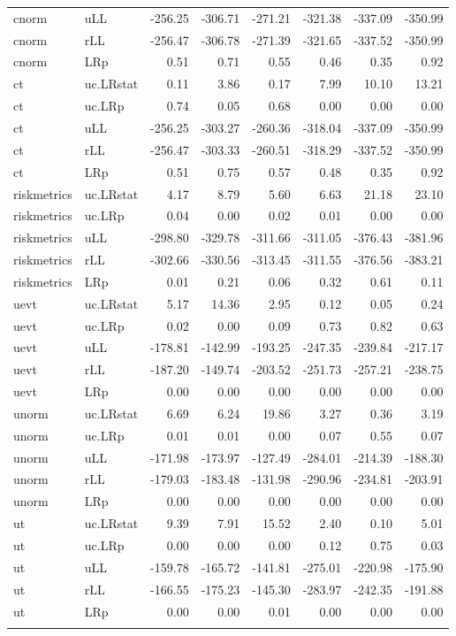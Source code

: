 \begin{longtable}{llrrrrrr}
  cnorm & uLL & -256.25 & -306.71 & -271.21 & -321.38 & -337.09 & -350.99 \\ 
  cnorm & rLL & -256.47 & -306.78 & -271.39 & -321.65 & -337.52 & -350.99 \\ 
  cnorm & LRp & 0.51 & 0.71 & 0.55 & 0.46 & 0.35 & 0.92 \\ 
  ct & uc.LRstat & 0.11 & 3.86 & 0.17 & 7.99 & 10.10 & 13.21 \\ 
  ct & uc.LRp & 0.74 & 0.05 & 0.68 & 0.00 & 0.00 & 0.00 \\ 
  ct & uLL & -256.25 & -303.27 & -260.36 & -318.04 & -337.09 & -350.99 \\ 
  ct & rLL & -256.47 & -303.33 & -260.51 & -318.29 & -337.52 & -350.99 \\ 
  ct & LRp & 0.51 & 0.75 & 0.57 & 0.48 & 0.35 & 0.92 \\ 
  riskmetrics & uc.LRstat & 4.17 & 8.79 & 5.60 & 6.63 & 21.18 & 23.10 \\ 
  riskmetrics & uc.LRp & 0.04 & 0.00 & 0.02 & 0.01 & 0.00 & 0.00 \\ 
  riskmetrics & uLL & -298.80 & -329.78 & -311.66 & -311.05 & -376.43 & -381.96 \\ 
  riskmetrics & rLL & -302.66 & -330.56 & -313.45 & -311.55 & -376.56 & -383.21 \\ 
  riskmetrics & LRp & 0.01 & 0.21 & 0.06 & 0.32 & 0.61 & 0.11 \\ 
  uevt & uc.LRstat & 5.17 & 14.36 & 2.95 & 0.12 & 0.05 & 0.24 \\ 
  uevt & uc.LRp & 0.02 & 0.00 & 0.09 & 0.73 & 0.82 & 0.63 \\ 
  uevt & uLL & -178.81 & -142.99 & -193.25 & -247.35 & -239.84 & -217.17 \\ 
  uevt & rLL & -187.20 & -149.74 & -203.52 & -251.73 & -257.21 & -238.75 \\ 
  uevt & LRp & 0.00 & 0.00 & 0.00 & 0.00 & 0.00 & 0.00 \\ 
  unorm & uc.LRstat & 6.69 & 6.24 & 19.86 & 3.27 & 0.36 & 3.19 \\ 
  unorm & uc.LRp & 0.01 & 0.01 & 0.00 & 0.07 & 0.55 & 0.07 \\ 
  unorm & uLL & -171.98 & -173.97 & -127.49 & -284.01 & -214.39 & -188.30 \\ 
  unorm & rLL & -179.03 & -183.48 & -131.98 & -290.96 & -234.81 & -203.91 \\ 
  unorm & LRp & 0.00 & 0.00 & 0.00 & 0.00 & 0.00 & 0.00 \\ 
  ut & uc.LRstat & 9.39 & 7.91 & 15.52 & 2.40 & 0.10 & 5.01 \\ 
  ut & uc.LRp & 0.00 & 0.00 & 0.00 & 0.12 & 0.75 & 0.03 \\ 
  ut & uLL & -159.78 & -165.72 & -141.81 & -275.01 & -220.98 & -175.90 \\ 
  ut & rLL & -166.55 & -175.23 & -145.30 & -283.97 & -242.35 & -191.88 \\ 
  ut & LRp & 0.00 & 0.00 & 0.01 & 0.00 & 0.00 & 0.00 \\ 
   \hline
\hline
\label{tab:vartest}
\end{longtable}
